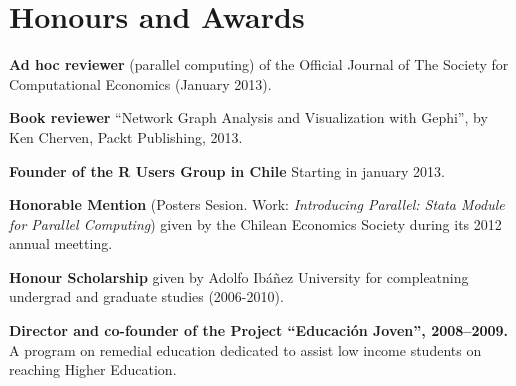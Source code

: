 \documentclass[letterpaper, 12pt]{article}
\def\footerlink{http://www.ggvega.com}
\renewenvironment{itemize}{
  \begin{list}{}{
    \setlength{\leftmargin}{0.45cm}
  }
}{
  \end{list}
}
\begin{document}
\section*{Honours and Awards}

\begin{itemize}
\item \textbf{Ad hoc reviewer} (parallel computing) of the Official Journal of The Society for Computational Economics (January 2013).
\item \textbf{Book reviewer} ``Network Graph Analysis and Visualization with Gephi'', by Ken Cherven, Packt Publishing, 2013.
\item \textbf{Founder of the R Users Group in Chile} Starting in january 2013.
\item \textbf{Honorable Mention} (Posters Sesion. Work: \emph{Introducing Parallel: Stata Module for Parallel Computing}) given by the Chilean Economics Society during its 2012 annual meetting.
\item \textbf{Honour Scholarship} given by Adolfo Ib\'a\~nez University for compleatning undergrad and graduate studies (2006-2010).
\item \textbf{Director and co-founder of the Project ``Educaci\'on Joven'', 2008--2009.} A program on remedial education
 dedicated to assist low income students on reaching Higher Education.
\end{itemize}


\end{document}
